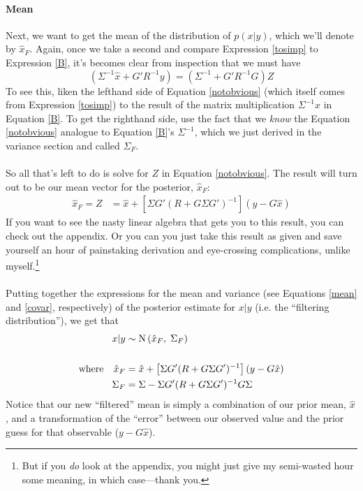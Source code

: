 \documentclass[a4paper,12pt]{article}
\begin{document}
\paragraph{Mean} 
Next, we want to get the {mean} of the distribution of 
$p(x|y)$, which we'll denote by $\hat{x}_F$.  Again, once we
take a second and compare Expression \ref{tosimp}
to Expression \ref{B}, it's becomes clear from inspection 
that we must have 
\begin{equation}
    \label{notobvious}
    (\Sigma^{-1} \hat{x} + G'R^{-1}y) 
	= \left( \Sigma^{-1} + G'R^{-1}G\right) Z
\end{equation}
To see this, 
liken the lefthand side of Equation \ref{notobvious} (which 
itself comes from Expression \ref{tosimp}) to
the result of the matrix multiplication $\Sigma^{-1}\hat{x}$ in
Equation \ref{B}. To get the righthand side, use the fact
that we \emph{know} the Equation \ref{notobvious} analogue
to Equation \ref{B}'s $\Sigma^{-1}$, which we just 
derived in the variance section and called $\Sigma_F$.
\\
\\
So all that's left to do is solve for $Z$ in Equation
\ref{notobvious}.  The result will turn out to be our mean
vector for the posterior, $\hat{x}_F$:
\begin{align}
    \label{mean}
    \hat{x}_F = Z 
        &= \hat{x} 
        + \left[\Sigma G' (R + G \Sigma G')^{-1}  \right]
        \left( y - G \hat{x} \right)  
\end{align}
If you want to see the nasty linear algebra that gets you
to this result, you can check out the appendix. Or you can 
you just take this result as given and save yourself an
hour of painstaking derivation and eye-crossing complications,
unlike myself.\footnote{But if you \emph{do} look at the appendix,
you might just give my semi-wasted hour some meaning, in which 
case---thank you.}
\\
\\
Putting together the expressions for the mean and variance
(see Equations \ref{mean} and \ref{covar}, respectively)
of the posterior estimate for $x|y$ (i.e. the ``filtering
distribution''), we get that
\begin{align}
    x | y &\sim \text{N} \left(\hat{x}_F, \; \Sigma_F\right) 
    \label{filtered} \\
    \notag\\
    \text{where} \quad \hat{x}_F &= \hat{x} 
	+ \left[\Sigma G' (R + G \Sigma G')^{-1}  \right]
	\left( y - G \hat{x} \right)  \notag \\
    \Sigma_F &= \Sigma - \Sigma G'(R 
	    + G\Sigma G')^{-1}
	    G\Sigma \notag
\end{align}
Notice that our new ``filtered'' mean is simply a 
combination of our prior mean, $\hat{x}$, and 
a transformation of the ``error'' between our
observed value and the prior guess for that
observable ($y - G\hat{x}$).
\end{document}
